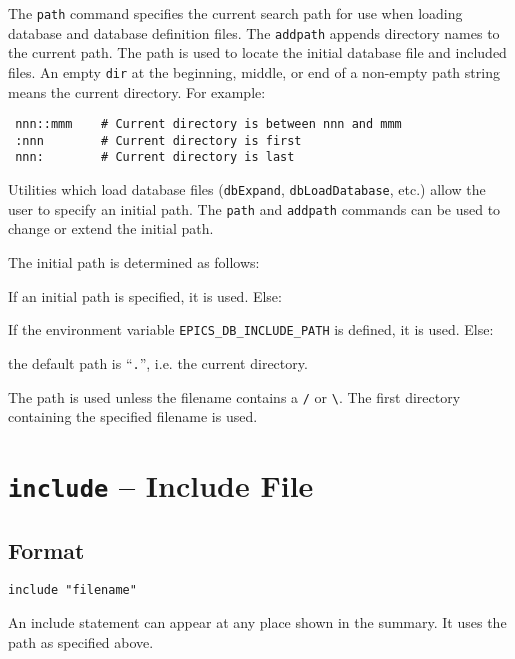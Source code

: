 The \verb|path| command specifies the current search path for use when loading database and database definition files.
The \verb|addpath| appends directory names to the current path.
The path is used to locate the initial database file and included files.
An empty \verb|dir| at the beginning, middle, or end of a non-empty path string means the current directory.
For example:

\begin{verbatim}
 nnn::mmm    # Current directory is between nnn and mmm
 :nnn        # Current directory is first
 nnn:        # Current directory is last
\end{verbatim}

Utilities which load database files (\verb|dbExpand|, \verb|dbLoadDatabase|, etc.) allow the user to specify an initial path. The 
\verb|path| and \verb|addpath| commands can be used to change or extend the initial path.

The initial path is determined as follows:

\begin{description}
\item If an initial path is specified, it is used. Else:

\item If the environment variable \verb|EPICS_DB_INCLUDE_PATH| is defined, it is used. Else:

\item the default path is ``\verb|.|'', i.e. the current directory.
\end{description}

The path is used unless the filename contains a \verb|/| or \verb|\|.
The first directory containing the specified filename is used.

\section{\texttt{include} -- Include File}

\subsection{Format}

\begin{verbatim}
include "filename"
\end{verbatim}

An include statement can appear at any place shown in the summary.
It uses the path as specified above.

